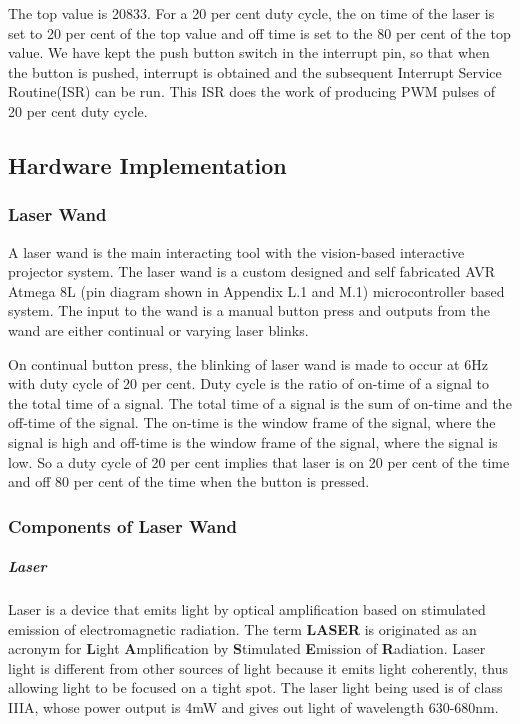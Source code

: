 \documentclass[12pt, a4paper]{article}
\begin{document}
	The top value is 20833. For a 20 per cent duty cycle, the on time of the laser is set to 20 per cent of the top value and off time is set to the 80 per cent of the top value. We have kept the push button switch in the interrupt pin, so that when the button is pushed, interrupt is obtained and the subsequent Interrupt Service Routine(ISR) can be run. This ISR does the work of producing PWM pulses of 20 per cent duty cycle. 

\subsection{Hardware Implementation}
\subsubsection{Laser Wand}

A laser wand is the main interacting tool with the vision-based interactive projector system. The laser wand is a custom designed and self fabricated AVR Atmega 8L (pin diagram shown in Appendix L.1 and M.1) microcontroller based system. The input to the wand is a manual button press and outputs from the wand are either continual or varying laser blinks. 

On continual button press, the blinking of laser wand is made to occur at 6Hz with duty cycle of 20 per cent. Duty cycle is the ratio of on-time of a signal to the total time of a signal. The total time of a signal is the sum of on-time and the off-time of the signal. The on-time is the window frame of the signal, where the signal is high and off-time is the window frame of the signal, where the signal is low. So a duty cycle of 20 per cent implies that laser is on 20 per cent of the time and off 80 per cent of the time when the button is pressed. 

\subsubsection{Components of Laser Wand}

\subparagraph{Laser}

Laser is a device that emits light by optical amplification based on stimulated emission of electromagnetic radiation. The term \textbf{LASER} is originated as an acronym for \textbf{L}ight \textbf{A}mplification by \textbf{S}timulated \textbf{E}mission of \textbf{R}adiation. Laser light is different from other sources of light because it emits light coherently, thus allowing light to be focused on a tight spot. The laser light being used is of class IIIA, whose power output is 4mW and gives out light of wavelength 630-680nm. 
\end{document}
